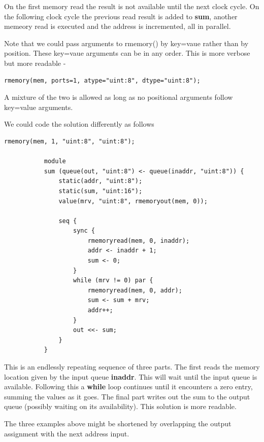        On the first memory read the result is not available until the next
        clock cycle. On the following clock cycle the previous read result
        is added to {\bf sum}, another memeory read is executed and the address
        is incremented, all in parallel.
        
        Note that we could pass arguments to rmemory() by key=vaue rather than
        by position. These key=vaue arguments can be in any order. This is more
        verbose but more readable -
        \begin{lstlisting}[gobble=8, language=threepl]
           rmemory(mem, ports=1, atype="uint:8", dtype="uint:8");
        \end{lstlisting}
        A mixture of the two is allowed as long as no positional arguments
        follow key=value arguments.
        
        We could code the solution differently as follows
        \begin{lstlisting}[gobble=8, language=threepl]
           rmemory(mem, 1, "uint:8", "uint:8");

           module
           sum (queue(out, "uint:8") <- queue(inaddr, "uint:8")) {
               static(addr, "uint:8");
               static(sum, "uint:16");
               value(mrv, "uint:8", rmemoryout(mem, 0));

               seq {
                   sync {
                       rmemoryread(mem, 0, inaddr);
                       addr <- inaddr + 1;
                       sum <- 0;
                   }
                   while (mrv != 0) par {
                       rmemoryread(mem, 0, addr);
                       sum <- sum + mrv;
                       addr++;
                   }
                   out <<- sum;
               }
           }
        \end{lstlisting}
        This is an endlessly repeating sequence of three
        parts. The first reads the memory location given by the
        input queue {\bf inaddr}. This will wait until the input queue
        is available. Following this a {\bf while} loop continues
        until it encounters a zero entry, summing the values
        as it goes. The final part writes out the sum to the
        output queue (possibly waiting on its availability).
        This solution is more readable.
        
        The three examples above might be shortened by overlapping
        the output assignment with the next address input.



